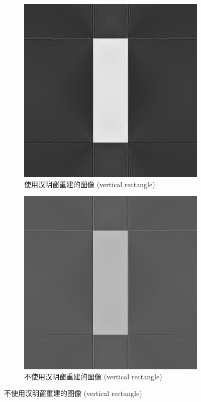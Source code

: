 \documentclass{article}
\begin{document}
\begin{figure}[H]
    \centering
    \begin{subfigure}{0.45\textwidth}
        \includegraphics[width=\textwidth]{../result_3_4/vertical_rectangle_reconstructed_hamming.png}
        \caption{使用汉明窗重建的图像 (vertical rectangle)}
    \end{subfigure}
    \hfill
    \begin{subfigure}{0.45\textwidth}
        \includegraphics[width=\textwidth]{../result_3_4/vertical_rectangle_reconstructed_no_hamming.png}
        \caption{不使用汉明窗重建的图像 (vertical rectangle)}
    \end{subfigure}
    

\end{figure}
\end{document}
